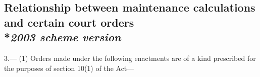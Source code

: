 \documentclass[12pt,a4paper]{article}
\begin{document}
\subsection[3. Relationship between maintenance calculations and certain court orders --- \emph{2003 scheme version}]{\sloppy Relationship between maintenance calculations and certain court orders\\*\emph{2003 scheme version}}

3.—%
%
%
%
%
%
%
(1) Orders made under the following enactments are of a kind prescribed for the purposes of section 10(1) of the Act—
\end{document}

